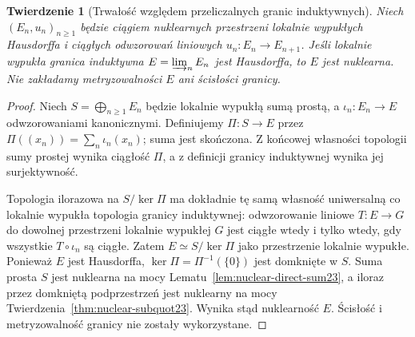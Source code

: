 \documentclass[11pt,a4paper]{article}
\numberwithin{equation}{section}
\theoremstyle{plain}
\newtheorem{twierdzenie}{Twierdzenie}[section]
\theoremstyle{definition}
\theoremstyle{remark}
\begin{document}
\begin{twierdzenie}[Trwałość względem przeliczalnych granic induktywnych]
\label{thm:nuclear-indlim23}
Niech $(E_n,u_n)_{n\ge1}$ będzie ciągiem nuklearnych
przestrzeni lokalnie wypukłych Hausdorffa i ciągłych
odwzorowań liniowych $u_n:E_n\to E_{n+1}$.
Jeśli lokalnie wypukła granica induktywna
$E=\varinjlim_n E_n$ jest Hausdorffa, to $E$ jest nuklearna.
Nie zakładamy metryzowalności $E$ ani ścisłości granicy.
\end{twierdzenie}
\begin{proof}
Niech $S=\bigoplus_{n\ge1}E_n$ będzie lokalnie wypukłą
sumą prostą, a $\iota_n:E_n\to E$ odwzorowaniami
kanonicznymi. Definiujemy
$\Pi:S\to E$ przez
$\Pi((x_n))=\sum_n\iota_n(x_n)$; suma jest skończona.
Z końcowej własności topologii sumy prostej wynika
ciągłość $\Pi$, a z definicji granicy induktywnej
wynika jej surjektywność.

Topologia ilorazowa na $S/\ker\Pi$ ma dokładnie tę samą
własność uniwersalną co lokalnie wypukła topologia
granicy induktywnej: odwzorowanie liniowe $T:E\to G$
do dowolnej przestrzeni lokalnie wypukłej $G$ jest ciągłe
wtedy i tylko wtedy, gdy wszystkie $T\circ\iota_n$ są ciągłe.
Zatem $E\simeq S/\ker\Pi$ jako przestrzenie lokalnie
wypukłe. Ponieważ $E$ jest Hausdorffa,
$\ker\Pi=\Pi^{-1}(\{0\})$ jest domknięte w $S$.
Suma prosta $S$ jest nuklearna na mocy
Lematu~\ref{lem:nuclear-direct-sum23}, a iloraz
przez domkniętą podprzestrzeń jest nuklearny na mocy
Twierdzenia~\ref{thm:nuclear-subquot23}. Wynika stąd
nuklearność $E$. Ścisłość i metryzowalność granicy
nie zostały wykorzystane.
\end{proof}
\end{document}
